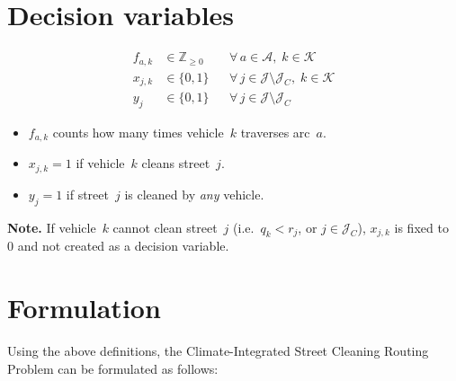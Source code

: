 \documentclass[11pt]{article}
\newcommand{\setJ}{\mathcal{J}}
\newcommand{\Jc}{\mathcal{J}_C}
\newcommand{\setA}{\mathcal{A}}
\newcommand{\setK}{\mathcal{K}}
\begin{document}
\section{Decision variables}

\begin{align}
f_{a,k} &\in \mathbb{Z}_{\ge 0}
    &&\forall\, a \in \setA,\; k \in \setK
    \tag{flow variable}\\[4pt]
x_{j,k} &\in \{0,1\}
    &&\forall\, j \in \setJ \setminus \Jc,\; k \in \setK
    \tag{cleaning assignment}\\[4pt]
y_j     &\in \{0,1\}
    &&\forall\, j \in \setJ \setminus \Jc
    \tag{cleaned indicator}
\end{align}

\begin{itemize}[nosep]
  \item $f_{a,k}$ counts how many times vehicle~$k$ traverses arc~$a$.
  \item $x_{j,k} = 1$ if vehicle~$k$ cleans street~$j$.
  \item $y_j = 1$ if street~$j$ is cleaned by \emph{any} vehicle.
\end{itemize}

\medskip\noindent
\textbf{Note.}
If vehicle~$k$ cannot clean street~$j$ (i.e.\ $q_k < r_j$, or $j \in \Jc$),
$x_{j,k}$ is fixed to~$0$ and not created as a decision variable.

\section{Formulation}

Using the above definitions, the Climate-Integrated Street Cleaning Routing
Problem can be formulated as follows:
\end{document}
